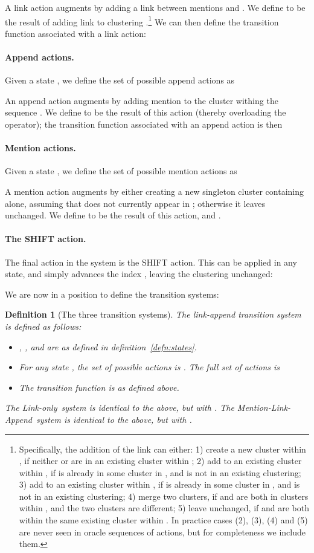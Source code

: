 \documentclass[11pt,a4paper]{article}
\newtheorem{definition}{Definition}
\newcommand{\M}{Mention-Link-Append}
\newcommand{\LO}{Link-only}
\begin{document}
A link action  augments  by adding a link between mentions  and . We define  to be the result of adding link  to clustering .\footnote{Specifically, the addition of the link  can either: 1) create a new cluster within , if neither  or  are in an existing cluster within ; 2) add  to an existing cluster within , if  is already in some cluster in , and  is not in an existing clustering; 3) add  to an existing cluster within , if  is already in some cluster in , and  is not in an existing clustering; 4) merge two clusters, if  and  are both in clusters within , and the two clusters are different; 5) leave  unchanged, if  and  are both within the same existing cluster within . In practice cases (2), (3), (4) and (5) are never seen in oracle sequences of actions, but for completeness we include them.}
We can then define the transition function associated with a link action:


\paragraph{Append actions.}
Given a state , we define the set of possible append actions as

An append action  augments  by adding mention  to the cluster  withing the sequence . We define  to be the result of this action (thereby overloading the  operator); the transition function associated with an append action is then


\paragraph{Mention actions.}
Given a state , we define the set of possible mention actions as

A mention action  augments  by either creating a new singleton cluster containing  alone, assuming that  does not currently appear in ; otherwise it leaves  unchanged. We define   to be the result of this action, and .

\paragraph{The SHIFT action.}
The final action in the system is the SHIFT action. This can be applied in any state, and simply advances the index , leaving the clustering  unchanged:


We are now in a position to define the transition systems:

\begin{definition}[The three transition systems]
The link-append transition system is defined as follows:
\begin{itemize}
    \item , , and  are as defined in definition~\ref{defn:states}.
    \item For any state , the set of possible actions is . The full set of actions is 
    \item The transition function  is as defined above.
\end{itemize}

The \LO~system is identical to the above, but with . The \M~system is identical to the above, but with .

\end{definition}
\end{document}
